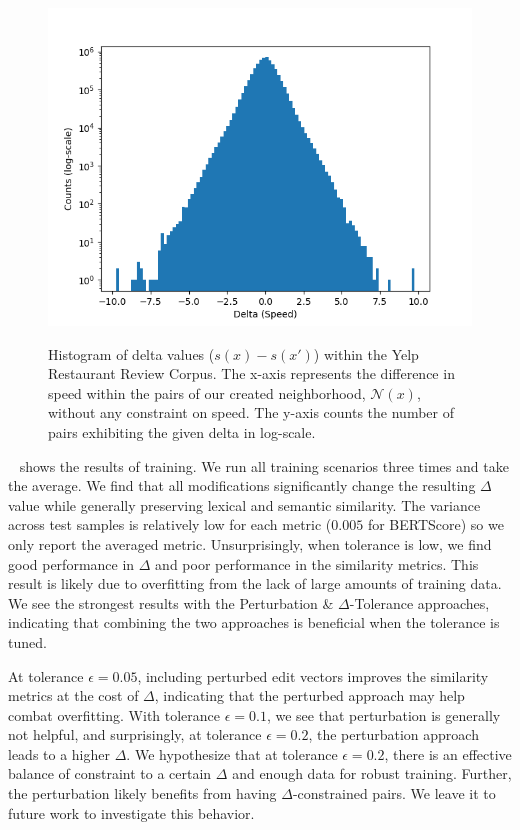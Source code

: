\begin{figure}[t]
  \centering
  \caption{Histogram of delta values (\ie $s(x) - s(x')$) within the Yelp Restaurant Review Corpus. The x-axis represents the difference in speed within the pairs of our created neighborhood, $\mathcal{N}(x)$, without any constraint on speed. The y-axis counts the number of pairs exhibiting the given delta in log-scale.}
  \includegraphics[width=0.6\linewidth]{figs/nedit_speed_distr.png}
  \vspace{0.1in}
  \label{fig:ne_speed_distr}
\end{figure}

~ shows the results of training. We run all training scenarios three times and take the average. We find that all modifications significantly change the resulting $\Delta$ value while generally preserving lexical and semantic similarity. The variance across test samples is relatively low for each metric (\eg $0.005$ for BERTScore) so we only report the averaged metric. Unsurprisingly, when tolerance is low, we find good performance in $\Delta$ and poor performance in the similarity metrics. This result is likely due to overfitting from the lack of large amounts of training data. We see the strongest results with the Perturbation \& $\Delta$-Tolerance approaches, indicating that combining the two approaches is beneficial when the tolerance is tuned. 

At tolerance $\epsilon = 0.05$, including perturbed edit vectors improves the similarity metrics at the cost of $\Delta$, indicating that the perturbed approach may help combat overfitting. With tolerance $\epsilon = 0.1$, we see that perturbation is generally not helpful, and surprisingly, at tolerance $\epsilon = 0.2$, the perturbation approach leads to a higher $\Delta$. We hypothesize that at tolerance $\epsilon = 0.2$, there is an effective balance of constraint to a certain $\Delta$ and enough data for robust training. Further, the perturbation likely benefits from having $\Delta$-constrained pairs. We leave it to future work to investigate this behavior.

